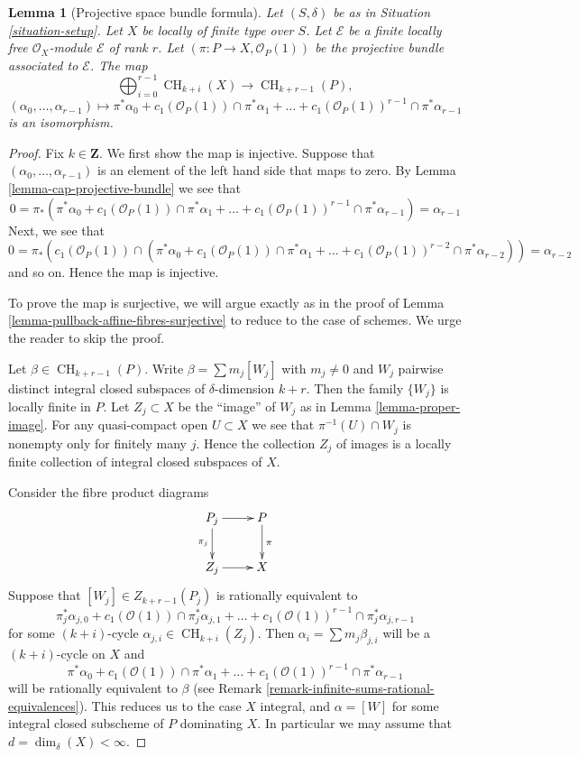 \documentclass[10pt,a4paper]{amsart}
\theoremstyle{plain}
\newtheorem{lemma}[subsection]{Lemma}
\theoremstyle{definition}
\theoremstyle{remark}
\numberwithin{equation}{subsection}
\def\CH{\mathop{\mathrm{CH}}\nolimits}
\begin{document}
\begin{lemma}[Projective space bundle formula]
\label{lemma-chow-ring-projective-bundle}
Let $(S, \delta)$ be as in Situation \ref{situation-setup}.
Let $X$ be locally of finite type over $S$.
Let $\mathcal{E}$ be a finite locally free $\mathcal{O}_X$-module
$\mathcal{E}$ of rank $r$. Let $(\pi : P \to X, \mathcal{O}_P(1))$
be the projective bundle associated to $\mathcal{E}$.
The map
$$
\bigoplus\nolimits_{i = 0}^{r - 1}
\CH_{k + i}(X)
\longrightarrow
\CH_{k + r - 1}(P),
$$
$$
(\alpha_0, \ldots, \alpha_{r-1})
\longmapsto
\pi^*\alpha_0 +
c_1(\mathcal{O}_P(1)) \cap \pi^*\alpha_1
+ \ldots +
c_1(\mathcal{O}_P(1))^{r - 1} \cap \pi^*\alpha_{r-1}
$$
is an isomorphism.
\end{lemma}

\begin{proof}
Fix $k \in \mathbf{Z}$. We first show the map is injective.
Suppose that $(\alpha_0, \ldots, \alpha_{r - 1})$ is an element
of the left hand side that maps to zero.
By Lemma \ref{lemma-cap-projective-bundle} we see that
$$
0 = \pi_*(\pi^*\alpha_0 +
c_1(\mathcal{O}_P(1)) \cap \pi^*\alpha_1
+ \ldots +
c_1(\mathcal{O}_P(1))^{r - 1} \cap \pi^*\alpha_{r-1})
= \alpha_{r - 1}
$$
Next, we see that
$$
0 = \pi_*(c_1(\mathcal{O}_P(1)) \cap (\pi^*\alpha_0 +
c_1(\mathcal{O}_P(1)) \cap \pi^*\alpha_1
+ \ldots +
c_1(\mathcal{O}_P(1))^{r - 2} \cap \pi^*\alpha_{r - 2}))
= \alpha_{r - 2}
$$
and so on. Hence the map is injective.

\medskip\noindent
To prove the map is surjective, we will argue exactly
as in the proof of Lemma \ref{lemma-pullback-affine-fibres-surjective}
to reduce to the case of schemes.
We urge the reader to skip the proof.

\medskip\noindent
Let $\beta \in \CH_{k + r - 1}(P)$. Write $\beta = \sum m_j[W_j]$ with
$m_j \not = 0$ and $W_j$ pairwise distinct integral closed subspaces of
$\delta$-dimension $k + r$. Then the family $\{W_j\}$
is locally finite in $P$. Let $Z_j \subset X$ be the ``image''
of $W_j$ as in Lemma \ref{lemma-proper-image}. For any quasi-compact open
$U \subset X$ we see that $\pi^{-1}(U) \cap W_j$
is nonempty only for finitely many $j$. Hence the
collection $Z_j$ of images is a locally finite collection
of integral closed subspaces of $X$.

\medskip\noindent
Consider the fibre product diagrams
$$
\xymatrix{
P_j \ar[r] \ar[d]_{\pi_j} & P \ar[d]^\pi \\
Z_j \ar[r] & X
}
$$
Suppose that $[W_j] \in Z_{k + r - 1}(P_j)$
is rationally equivalent to
$$
\pi_j^*\alpha_{j, 0} +
c_1(\mathcal{O}(1)) \cap \pi_j^*\alpha_{j, 1} +
\ldots +
c_1(\mathcal{O}(1))^{r - 1} \cap \pi_j^*\alpha_{j, r - 1}
$$
for some $(k + i)$-cycle $\alpha_{j, i} \in \CH_{k + i}(Z_j)$. Then
$\alpha_i = \sum m_j \beta_{j, i}$ will be a $(k + i)$-cycle on $X$
and
$$
\pi^*\alpha_0 +
c_1(\mathcal{O}(1)) \cap \pi^*\alpha_1 +
\ldots +
c_1(\mathcal{O}(1))^{r - 1} \cap \pi^*\alpha_{r - 1}
$$
will be rationally equivalent to $\beta$ (see
Remark \ref{remark-infinite-sums-rational-equivalences}).
This reduces us to the case $X$ integral, and
$\alpha = [W]$ for some integral closed subscheme
of $P$ dominating $X$. In particular we may
assume that $d = \dim_\delta(X) < \infty$.


\end{proof}
\end{document}
